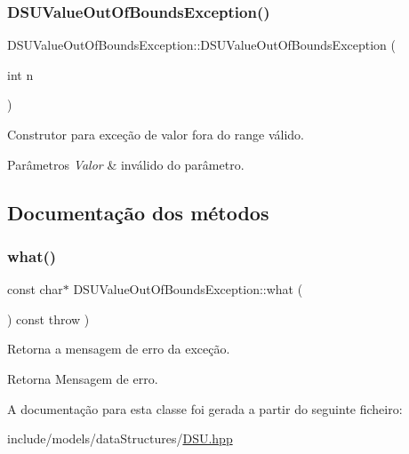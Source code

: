 \subsubsection{\texorpdfstring{D\+S\+U\+Value\+Out\+Of\+Bounds\+Exception()}{DSUValueOutOfBoundsException()}}
{\footnotesize\ttfamily D\+S\+U\+Value\+Out\+Of\+Bounds\+Exception\+::\+D\+S\+U\+Value\+Out\+Of\+Bounds\+Exception (\begin{DoxyParamCaption}\item[{int}]{n }\end{DoxyParamCaption})\hspace{0.3cm}{\ttfamily [inline]}}

Construtor para exceção de valor fora do range válido. 
\begin{DoxyParams}{Parâmetros}
{\em Valor} & inválido do parâmetro. \\
\hline
\end{DoxyParams}


\subsection{Documentação dos métodos}
\mbox{\label{classDSUValueOutOfBoundsException_a20697d2be588c4f19046c9f468675bde}} 
\subsubsection{\texorpdfstring{what()}{what()}}
{\footnotesize\ttfamily const char$\ast$ D\+S\+U\+Value\+Out\+Of\+Bounds\+Exception\+::what (\begin{DoxyParamCaption}{ }\end{DoxyParamCaption}) const throw  ) \hspace{0.3cm}{\ttfamily [inline]}}

Retorna a mensagem de erro da exceção. \begin{DoxyReturn}{Retorna}
Mensagem de erro. 
\end{DoxyReturn}


A documentação para esta classe foi gerada a partir do seguinte ficheiro\+:\begin{DoxyCompactItemize}
\item 
include/models/data\+Structures/\hyperlink{DSU_8hpp}{D\+S\+U.\+hpp}\end{DoxyCompactItemize}
